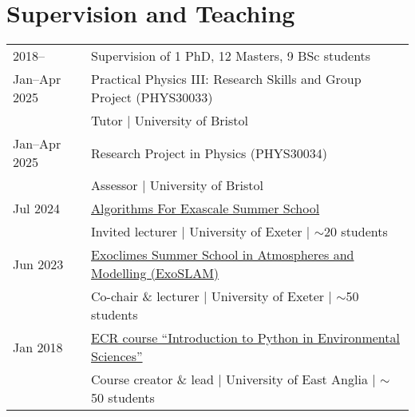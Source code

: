 \documentclass[a4paper, 11pt]{article}
\begin{document}
\section{Supervision and Teaching}
\begin{tabularx}{\linewidth}{@{}l X@{}}
2018-- & Supervision of 1 PhD, 12 Masters, 9 BSc students \\
Jan--Apr 2025 & Practical Physics III: Research Skills and Group Project (PHYS30033) \\ & Tutor | University of Bristol \\
Jan--Apr 2025 & Research Project in Physics (PHYS30034) \\ & Assessor | University of Bristol \\
Jul 2024 & \href{https://sites.google.com/view/algorithmsforexascale/home}{Algorithms For Exascale Summer School} \\ & Invited lecturer | University of Exeter | $\sim$20 students \\
Jun 2023 & \href{https://exoclimes.org/exoslam/index.html}{Exoclimes Summer School in Atmospheres and Modelling (ExoSLAM)} \\ & Co-chair \& lecturer | University of Exeter | $\sim$50 students \\
Jan 2018 & \href{https://ueapy.github.io/pythoncourse2018}{ECR course ``Introduction to Python in Environmental Sciences''} \\ & Course creator \& lead | University of East Anglia | $\sim$50 students \\
\end{tabularx}

\end{document}
